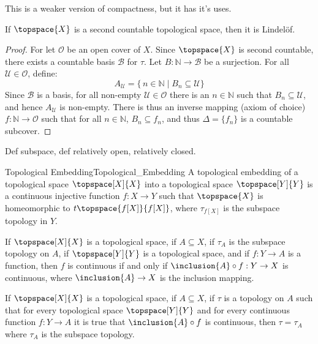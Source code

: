     This is a weaker version of compactness, but it has it's uses.
    \begin{theorem}
        If $\topspace{X}$ is a second countable topological space, then it
        is Lindel\"{o}f.
    \end{theorem}
    \begin{proof}
        For let $\mathcal{O}$ be an open cover of $X$. Since $\topspace{X}$
        is second countable, there exists a countable basis $\mathcal{B}$
        for $\tau$. Let $B:\mathbb{N}\rightarrow\mathcal{B}$ be a
        surjection. For all $\mathcal{U}\in\mathcal{O}$, define:
        \begin{equation}
            A_{\mathcal{U}}=
                \{\,n\in\mathbb{N}\;|\;B_{n}\subseteq\mathcal{U}\}
        \end{equation}
        Since $\mathcal{B}$ is a basis, for all non-empty
        $\mathcal{U}\in\mathcal{O}$ there is an $n\in\mathbb{N}$ such that
        $B_{n}\subseteq\mathcal{U}$, and hence $A_{\mathcal{U}}$ is
        non-empty. There is thus an inverse mapping (axiom of choice)
        $f:\mathbb{N}\rightarrow\mathcal{O}$ such that for all
        $n\in\mathbb{N}$, $B_{n}\subseteq{f}_{n}$, and thus
        $\Delta=\{f_{n}\}$ is a countable subcover.
    \end{proof}
    Def subspace, def relatively open, relatively closed.
    \begin{fdefinition}{Topological Embedding}{Topological_Embedding}
        A topological embedding of a topological space $\topspace[X]{X}$
        into a topological space $\topspace[Y]{Y}$ is a continuous injective
        function $f:X\rightarrow{Y}$ such that $\topspace{X}$ is
        homeomorphic to $t\topspace{f[X]}{f[X]}$, where
        $\tau_{f[X]}$ is the subspace topology in $Y$.
    \end{fdefinition}
    \begin{theorem}
        If $\topspace[X]{X}$ is a topological space, if $A\subseteq{X}$,
        if $\tau_{A}$ is the subspace topology on $A$, if $\topspace[Y]{Y}$
        is a topological space, and if $f:Y\rightarrow{A}$ is a function,
        then $f$ is continuous if and only if
        $\inclusion{A}\circ{f}:Y\rightarrow{X}$ is continuous, where
        $\inclusion{A}\rightarrow{X}$ is the inclusion mapping.
    \end{theorem}
    \begin{theorem}
        If $\topspace[X]{X}$ is a topological space, if $A\subseteq{X}$,
        if $\tau$ is a topology on $A$ such that for every topological space
        $\topspace[Y]{Y}$ and for every continuous function
        $f:Y\rightarrow{A}$ it is true that $\inclusion{A}\circ{f}$ is
        continuous, then $\tau=\tau_{A}$ where $\tau_{A}$ is the subspace
        topology.
    \end{theorem}
